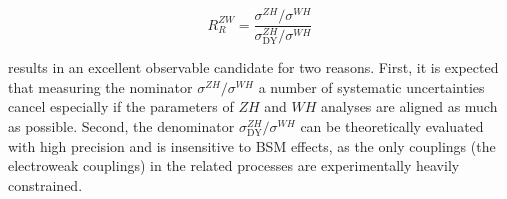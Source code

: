 \begin{equation}
	R^{ZW}_R = \frac{\sigma^{ZH}/\sigma^{WH}}{\sigma^{ZH}_\text{DY}/\sigma^{WH}}
\end{equation}

results in an excellent observable candidate for two reasons. First, it is expected that measuring the nominator $\sigma^{ZH}/\sigma^{WH}$ a number of systematic uncertainties cancel especially if the parameters of $ZH$ and $WH$ analyses are aligned as much as possible. Second, the denominator $\sigma^{ZH}_\text{DY}/\sigma^{WH}$ can be theoretically evaluated with high precision and is insensitive to BSM effects, as the only couplings (the electroweak couplings) in the related processes are experimentally heavily constrained.
